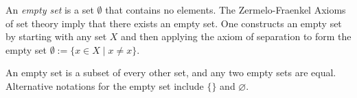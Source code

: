 \documentclass{article}
\begin{document}
An {\em empty set} is a set $\emptyset$ that contains no elements. The Zermelo-Fraenkel Axioms of set theory imply that there exists an empty set. One constructs an empty set by starting with any set $X$ and then applying the axiom of separation to form the empty set $\emptyset := \{ x \in X \mid x \neq x\}$.

An empty set is a subset of every other set, and any two empty sets are equal. Alternative notations for the empty set include $\{\}$ and $\varnothing$.
\end{document}
